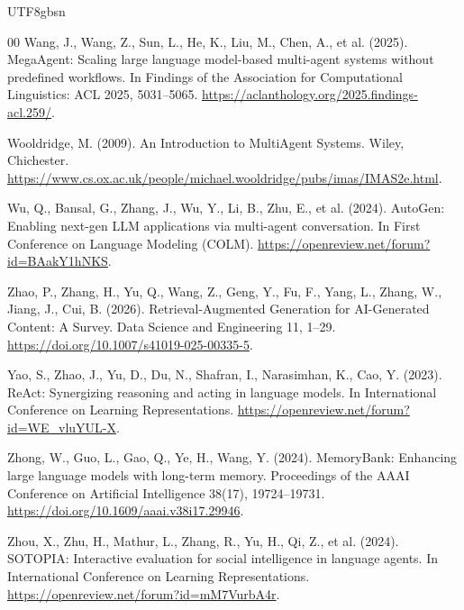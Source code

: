 \documentclass[a4paper,fleqn]{cas-sc}
\begin{document}
\begin{CJK*}{UTF8}{gbsn}
\begin{thebibliography}{00}
Wang, J., Wang, Z., Sun, L., He, K., Liu, M., Chen, A., et al. (2025). MegaAgent: Scaling large language model-based multi-agent systems without predefined workflows. In Findings of the Association for Computational Linguistics: ACL 2025, 5031--5065. \url{https://aclanthology.org/2025.findings-acl.259/}.

Wooldridge, M. (2009). An Introduction to MultiAgent Systems. Wiley, Chichester. \url{https://www.cs.ox.ac.uk/people/michael.wooldridge/pubs/imas/IMAS2e.html}.

Wu, Q., Bansal, G., Zhang, J., Wu, Y., Li, B., Zhu, E., et al. (2024). AutoGen: Enabling next-gen LLM applications via multi-agent conversation. In First Conference on Language Modeling (COLM). \url{https://openreview.net/forum?id=BAakY1hNKS}.

Zhao, P., Zhang, H., Yu, Q., Wang, Z., Geng, Y., Fu, F., Yang, L., Zhang, W., Jiang, J., Cui, B. (2026). Retrieval-Augmented Generation for AI-Generated Content: A Survey. Data Science and Engineering 11, 1--29. \url{https://doi.org/10.1007/s41019-025-00335-5}.

Yao, S., Zhao, J., Yu, D., Du, N., Shafran, I., Narasimhan, K., Cao, Y. (2023). ReAct: Synergizing reasoning and acting in language models. In International Conference on Learning Representations. \url{https://openreview.net/forum?id=WE_vluYUL-X}.

Zhong, W., Guo, L., Gao, Q., Ye, H., Wang, Y. (2024). MemoryBank: Enhancing large language models with long-term memory. Proceedings of the AAAI Conference on Artificial Intelligence 38(17), 19724--19731. \url{https://doi.org/10.1609/aaai.v38i17.29946}.

Zhou, X., Zhu, H., Mathur, L., Zhang, R., Yu, H., Qi, Z., et al. (2024). SOTOPIA: Interactive evaluation for social intelligence in language agents. In International Conference on Learning Representations. \url{https://openreview.net/forum?id=mM7VurbA4r}.

\end{thebibliography}

\end{CJK*}
\end{document}
